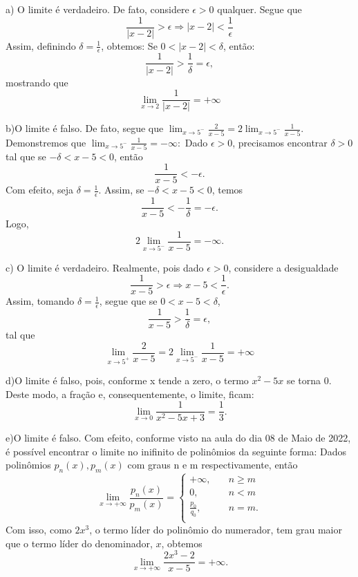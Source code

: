 \documentclass[Calculus1/exercícios_de_cálculo.tex]{subfiles}
\begin{document}
\begin{sol*}
	a) O limite é verdadeiro. De fato, considere $\epsilon > 0$ qualquer. Segue que
	$$
		\frac{1}{|x - 2|} > \epsilon \Rightarrow |x - 2| < \frac{1}{\epsilon}
	$$
	Assim, definindo $\delta = \frac{1}{\epsilon}$, obtemos: Se $0 < |x - 2| < \delta$, então:
	$$
		\frac{1}{|x - 2|} > \frac{1}{\delta} = \epsilon,
	$$
	mostrando que
	$$
		\lim_{x\to2}\frac{1}{|x - 2|}=+\infty
	$$

	b)O limite é falso. De fato, segue que  $\lim_{x\to5^-}\frac{2}{x - 5} = 2\lim_{x\to5^-}\frac{1}{x - 5}.$ Demonstremos que $\lim_{x\to5^-}\frac{1}{x - 5} = -\infty:$ Dado $\epsilon > 0$, precisamos encontrar $\delta > 0$ tal que se $-\delta < x - 5< 0$, então
	$$
		\frac{1}{x - 5} < -\epsilon.
	$$
	Com efeito, seja $\delta = \frac{1}{\epsilon}.$ Assim, se $-\delta < x - 5< 0$, temos
	$$
		\frac{1}{x - 5} < -\frac{1}{\delta} = -\epsilon.
	$$
	Logo,
	$$
		2\lim_{x\to5^-}\frac{1}{x - 5} = -\infty.
	$$

	c) O limite é verdadeiro. Realmente, pois dado $\epsilon > 0$, considere a desigualdade
	$$
		\frac{1}{x - 5} > \epsilon \Rightarrow x - 5 < \frac{1}{\epsilon}.
	$$
	Assim, tomando $\delta = \frac{1}{\epsilon}$, segue que se $0 < x - 5 < \delta$,
	$$
		\frac{1}{x - 5} > \frac{1}{\delta} = \epsilon,
	$$
	tal que
	$$
		\lim_{x\to5^+}\frac{2}{x - 5} = 2\lim_{x\to5^-}\frac{1}{x - 5} = +\infty
	$$

	d)O limite é falso, pois, conforme x tende a zero, o termo $x^2 - 5x$ se torna 0. Deste modo, a fração e, consequentemente, o limite, ficam:
	$$
		\lim_{x\to0}\frac{1}{x^2 - 5x + 3} = \frac{1}{3}.
	$$

	e)O limite é falso. Com efeito, conforme visto na aula do dia 08 de Maio de 2022, é possível encontrar o limite no inifinito de polinômios da seguinte forma: Dados polinômios $p_n(x), p_m(x)$ com graus n e m respectivamente, então
	$$
		\lim_{x\to+\infty}\frac{p_n(x)}{p_m(x)} =
		\left\{\begin{array}{ll}
			+\infty,         & \quad n\geq{m} \\
			0,               & \quad n < m    \\
			\frac{p_0}{q_0}, & \quad n = m.   \\
		\end{array}\right.
	$$
	Com isso, como $2x^3$, o termo líder do polinômio do numerador, tem grau maior que o termo l\'ider do denominador, $x$, obtemos
	$$
		\lim_{x\to+\infty}\frac{2x^3 - 2}{x-5} = +\infty.
	$$
	\qedsymbol
\end{sol*}
\end{document}
